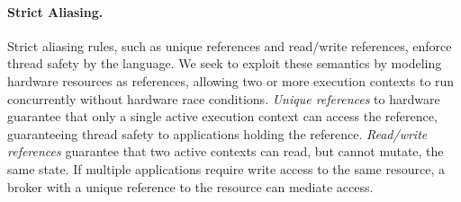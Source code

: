 \paragraph{Strict Aliasing.}
Strict aliasing rules, such as unique references and read/write references,
enforce thread safety by the language. We seek to exploit these semantics by
modeling hardware resources as references, allowing two or more execution
contexts to run concurrently without hardware race conditions. \textit{Unique
references} to hardware guarantee that only a single active execution context
can access the reference, guaranteeing thread safety to applications holding the
reference.  \textit{Read/write references} guarantee that two active contexts
can read, but cannot mutate, the same state.  If multiple applications require
write access to the same resource, a broker with a unique reference to the
resource can mediate access.

